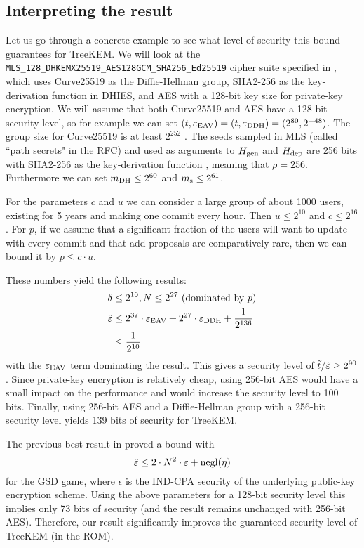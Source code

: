 \subsection{Interpreting the result}

Let us go through a concrete example to see what level of security this bound guarantees for TreeKEM. We will look at the \texttt{MLS\_128\_DHKEMX25519\_AES128GCM\_SHA256\_Ed25519} cipher suite specified in \cite[Section~17.1]{rfc9420}, which uses Curve25519 as the Diffie-Hellman group, SHA2-256 as the key-derivation function in DHIES, and AES with a 128-bit key size for private-key encryption. We will assume that both Curve25519 and AES have a 128-bit security level, so for example we can set $(t, \varepsilon_\mathrm{EAV}) = (t, \varepsilon_\mathrm{DDH}) = (2^{80}, 2^{-48})$. The group size for Curve25519 is at least $2^{252}$ \cite{curve25519}. The seeds sampled in MLS (called ``path secrets" in the RFC) and used as arguments to $H_\mathrm{gen}$ and $H_\mathrm{dep}$ are 256 bits with SHA2-256 as the key-derivation function \cite{rfc9420}, meaning that $\rho = 256$. Furthermore we can set $m_\mathrm{DH} \le 2^{60}$ and $m_\mathrm{s} \le 2^{61}$.

For the parameters $c$ and $u$ we can consider a large group of about 1000 users, existing for 5 years and making one commit every hour. Then $u \le 2^{10}$ and $c \le 2^{16}$. For $p$, if we assume that a significant fraction of the users will want to update with every commit and that add proposals are comparatively rare, then we can bound it by $p \le c \cdot u$.

These numbers yield the following results:
\begin{align*}
	\delta & \le 2^{10}, N \le 2^{27}                                                      \text{ (dominated by $p$)} \\
	\tilde{\varepsilon}    & \le 2^{37} \cdot \varepsilon_\mathrm{EAV} + 2^{27} \cdot \varepsilon_\mathrm{DDH} + \frac{1}{2^{136}}                                          \\
	       & \le \frac{1}{2^{10}}
\end{align*}
with the $\varepsilon_\mathrm{EAV}$ term dominating the result. This gives a security level of $\tilde{t}/\tilde{\varepsilon} \ge 2^{90}$. Since private-key encryption is relatively cheap, using 256-bit AES would have a small impact on the performance and would increase the security level to 100 bits. Finally, using 256-bit AES and a Diffie-Hellman group with a 256-bit security level yields 139 bits of security for TreeKEM.

The previous best result in \cite[Theorem 3]{ttkem} proved a bound with
\[
	\tilde{\varepsilon} \le 2 \cdot N^2 \cdot \varepsilon + \mathrm{negl}(\eta)
\]
for the GSD game, where $\epsilon$ is the IND-CPA security of the underlying public-key encryption scheme. Using the above parameters for a 128-bit security level this implies only 73 bits of security (and the result remains unchanged with 256-bit AES). Therefore, our result significantly improves the guaranteed security level of TreeKEM (in the ROM).
